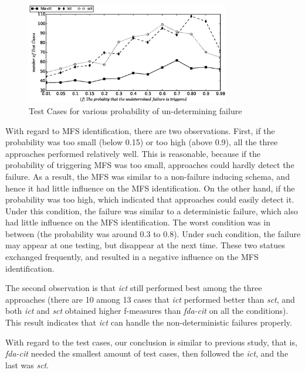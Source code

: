 \documentclass[10pt,journal,compsoc]{IEEEtran}
\begin{document}
\begin{figure}[htbp]
 \includegraphics[width=3.5in]{sen_und_tests.eps}
\caption{Test Cases for various probability of un-determining failure}
\label{sen_und_tests_result}
\end{figure}

With regard to MFS identification, there are two observations. First, if the probability was too small (below 0.15) or too high (above 0.9), all the three approaches performed relatively well. This is reasonable, because if the probability of triggering MFS was too small, approaches could hardly detect the failure. As a result, the MFS was similar to a non-failure inducing schema, and hence it had little influence on the MFS identification. On the other hand, if the probability was too high, which indicated that approaches could easily detect it. Under this condition, the failure was similar to a deterministic failure, which also had little influence on the MFS identification. The worst condition was in between (the probability was around 0.3 to 0.8). Under such condition, the failure may appear at one testing, but disappear at the next time. These two statues exchanged frequently, and resulted in a negative influence on the MFS identification.


The second observation is that \emph{ict} still performed best among the three approaches (there are 10 among 13 cases that \emph{ict} performed better than \emph{sct}, and both \emph{ict} and \emph{sct} obtained higher f-measures than \emph{fda-cit} on all the conditions). This result indicates that \emph{ict} can handle the non-deterministic failures properly.

With regard to the test cases, our conclusion is similar to previous study, that is, \emph{fda-cit} needed the smallest amount of test cases, then followed the \emph{ict}, and the last was \emph{sct}.
\end{document}
